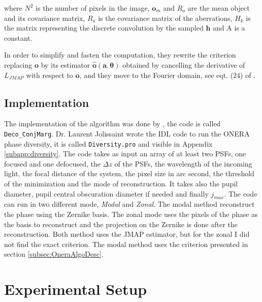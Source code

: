 where $N^2$ is the number of pixels in the image, $\mathbf{o}_m$ and $R_o$ are the mean object and its covariance matrix, $R_a$ is the covariance matrix of the aberrations, $H_k$ is the matrix representing the discrete convolution by the sampled $\mathbf{h}$ and A is a constant.

In order to simplify and fasten the computation, they rewrite the criterion replacing $\mathbf{o}$ by its estimator $\hat{\mathbf{o}}(\mathbf{a},\boldsymbol{\theta})$ obtained by cancelling the derivative of $L_{JMAP}$ with respect to $\mathbf{o}$, and they move to the Fourier domain, see eqt. (24) of \citet[p.21]{mugnier_2006}.

\subsection{Implementation}
\label{subsec:OneraAlgoImp}

The implementation of the algorithm was done by \citet{mugnier_2006}, the code is called \verb!Deco_ConjMarg!. Dr. Laurent Jolissaint wrote the IDL code to run the ONERA phase diversity, it is called \verb!Diversity.pro! and visible in Appendix \ref{subapp:diversity}. The code takes as input an array of at least two PSFs, one focused and one defocused, the $\Delta z$ of the PSFs, the wavelength of the incoming light, the focal distance of the system, the pixel size in arc second, the threshold of the minimization and the mode of reconstruction. It takes also the pupil diameter, pupil central obscuration diameter if needed and finally $j_{max}$. The code can run in two different mode, \textit{Modal} and \textit{Zonal}. The modal method reconstruct the phase using the Zernike basis. The zonal mode uses the pixels of the phase as the basis to reconstruct and the projection on the Zernike is done after the reconstruction. Both method uses the JMAP estimator, but for the zonal I did not find the exact criterion. The modal method uses the criterion presented in section \ref{subsec:OneraAlgoDesc}. 

\section{Experimental Setup}
\label{sec:ExpSetup}

